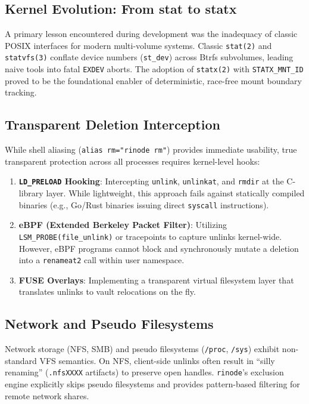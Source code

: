 \documentclass[11pt,a4paper]{article}
\begin{document}
\subsection{Kernel Evolution: From stat to statx}
A primary lesson encountered during development was the inadequacy of classic POSIX interfaces for modern multi-volume systems. Classic \texttt{stat(2)} and \texttt{statvfs(3)} conflate device numbers (\texttt{st\_dev}) across Btrfs subvolumes, leading naive tools into fatal \texttt{EXDEV} aborts. The adoption of \texttt{statx(2)} with \texttt{STATX\_MNT\_ID} proved to be the foundational enabler of deterministic, race-free mount boundary tracking.

\subsection{Transparent Deletion Interception}
While shell aliasing (\texttt{alias rm="rinode rm"}) provides immediate usability, true transparent protection across all processes requires kernel-level hooks:
\begin{enumerate}[leftmargin=1.5em]
    \item \textbf{\texttt{LD\_PRELOAD} Hooking}: Intercepting \texttt{unlink}, \texttt{unlinkat}, and \texttt{rmdir} at the C-library layer. While lightweight, this approach fails against statically compiled binaries (e.g., Go/Rust binaries issuing direct \texttt{syscall} instructions).
    \item \textbf{eBPF (Extended Berkeley Packet Filter)}: Utilizing \texttt{LSM\_PROBE(file\_unlink)} or tracepoints to capture unlinks kernel-wide. However, eBPF programs cannot block and synchronously mutate a deletion into a \texttt{renameat2} call within user namespace.
    \item \textbf{FUSE Overlays}: Implementing a transparent virtual filesystem layer that translates unlinks to vault relocations on the fly.
\end{enumerate}

\subsection{Network and Pseudo Filesystems}
Network storage (NFS, SMB) and pseudo filesystems (\texttt{/proc}, \texttt{/sys}) exhibit non-standard VFS semantics. On NFS, client-side unlinks often result in ``silly renaming'' (\texttt{.nfsXXXX} artifacts) to preserve open handles. \texttt{rinode}'s exclusion engine explicitly skips pseudo filesystems and provides pattern-based filtering for remote network shares.
\end{document}

